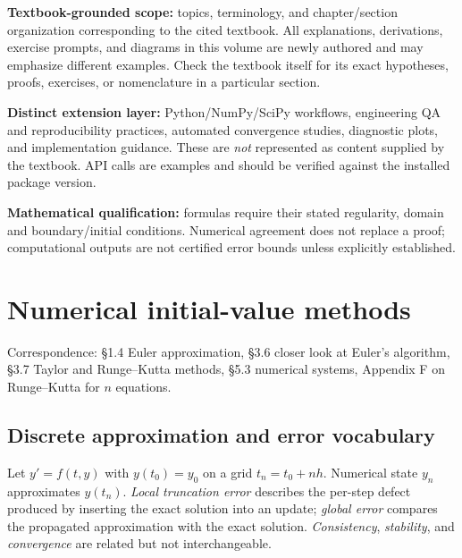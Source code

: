 \documentclass[11pt,letterpaper,oneside]{report}
\theoremstyle{definition}\newtheorem{definition}[theorem]{Definition}
\theoremstyle{remark}\newtheorem{remark}[theorem]{Remark}
\begin{document}
\begin{bookground}
\textbf{Textbook-grounded scope:} topics, terminology, and chapter/section organization corresponding to the cited textbook. All explanations, derivations, exercise prompts, and diagrams in this volume are newly authored and may emphasize different examples. Check the textbook itself for its exact hypotheses, proofs, exercises, or nomenclature in a particular section.
\end{bookground}
\begin{modern}
\textbf{Distinct extension layer:} Python/NumPy/SciPy workflows, engineering QA and reproducibility practices, automated convergence studies, diagnostic plots, and implementation guidance. These are \emph{not} represented as content supplied by the textbook. API calls are examples and should be verified against the installed package version.
\end{modern}
\begin{caution}
\textbf{Mathematical qualification:} formulas require their stated regularity, domain and boundary/initial conditions. Numerical agreement does not replace a proof; computational outputs are not certified error bounds unless explicitly established.
\end{caution}
\tableofcontents\clearpage{}
\chapter{Numerical initial-value methods}
\begin{bookground}Correspondence: \S1.4 Euler approximation, \S3.6 closer look at Euler's algorithm, \S3.7 Taylor and Runge--Kutta methods, \S5.3 numerical systems, Appendix F on Runge--Kutta for $n$ equations.\end{bookground}
\section{Discrete approximation and error vocabulary}
Let $y'=f(t,y)$ with $y(t_0)=y_0$ on a grid $t_n=t_0+nh$. Numerical state $y_n$ approximates $y(t_n)$. \emph{Local truncation error} describes the per-step defect produced by inserting the exact solution into an update; \emph{global error} compares the propagated approximation with the exact solution. \emph{Consistency}, \emph{stability}, and \emph{convergence} are related but not interchangeable.
\end{document}
